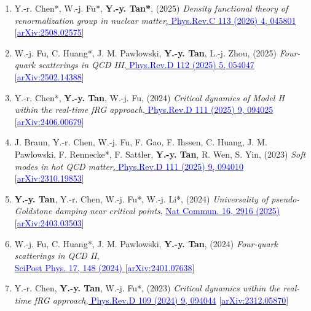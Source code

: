 \documentclass[11pt,a4paper]{article}
\begin{document}
\begin{enumerate}
\item Y.-r. Chen*, W.-j. Fu*, \textbf{Y.-y. Tan*}, (2025) \textit{Density functional theory of renormalization group in nuclear matter}\href{{https://doi.org/10.1103/4nrk-7sc4}}{, \textcolor{blue}{Phys.Rev.C 113 (2026) 4, 045801}} [\href{https://arxiv.org/abs/2508.02575}{\textcolor{blue}{arXiv:2508.02575}}]

\item W.-j. Fu, C. Huang*, J. M. Pawlowski, \textbf{Y.-y. Tan}, L.-j. Zhou, (2025) \textit{Four-quark scatterings in QCD III}\href{{https://doi.org/10.1103/4sh5-w4yc}}{, \textcolor{blue}{Phys.Rev.D 112 (2025) 5, 054047}} [\href{https://arxiv.org/abs/2502.14388}{\textcolor{blue}{arXiv:2502.14388}}]

\item Y.-r. Chen*, \textbf{Y.-y. Tan}, W.-j. Fu, (2024) \textit{Critical dynamics of Model H within the real-time fRG approach}\href{{https://doi.org/10.1103/PhysRevD.111.094025}}{, \textcolor{blue}{Phys.Rev.D 111 (2025) 9, 094025}} [\href{https://arxiv.org/abs/2406.00679}{\textcolor{blue}{arXiv:2406.00679}}]

\item J. Braun, Y.-r. Chen, W.-j. Fu, F. Gao, F. Ihssen, C. Huang, J. M. Pawlowski, F. Rennecke*, F. Sattler, \textbf{Y.-y. Tan}, R. Wen, S. Yin, (2023) \textit{Soft modes in hot QCD matter}\href{{https://doi.org/10.1103/PhysRevD.111.094010}}{, \textcolor{blue}{Phys.Rev.D 111 (2025) 9, 094010}} [\href{https://arxiv.org/abs/2310.19853}{\textcolor{blue}{arXiv:2310.19853}}]

\item\textbf{Y.-y. Tan}, Y.-r. Chen, W.-j. Fu*, W.-j. Li*, (2024) \textit{Universality of pseudo-Goldstone damping near critical points},  \href{https://doi.org/10.1038/s41467-025-58170-1}{\textcolor{blue}{Nat Commun. 16, 2916 (2025)}} [\href{https://arxiv.org/abs/2403.03503}{\textcolor{blue}{arXiv:2403.03503}}]

\item W.-j. Fu, C. Huang*, J. M. Pawlowski, \textbf{Y.-y. Tan}, (2024) \textit{Four-quark scatterings in QCD II},\\
\href{{https://doi.org/10.21468/SciPostPhys.17.5.148}}{\textcolor{blue}{SciPost Phys. 17, 148 (2024)} } [\href{https://arxiv.org/abs/2401.07638}{\textcolor{blue}{arXiv:2401.07638}}]

\item Y.-r. Chen, \textbf{Y.-y. Tan}, W.-j. Fu*, (2023) \textit{Critical dynamics within the real-time fRG approach}\href{{https://doi.org/10.1103/PhysRevD.109.094044}}{, \textcolor{blue}{Phys.Rev.D 109 (2024) 9, 094044}} [\href{https://arxiv.org/abs/2312.05870}{\textcolor{blue}{arXiv:2312.05870}}]


\end{enumerate}
\end{document}
